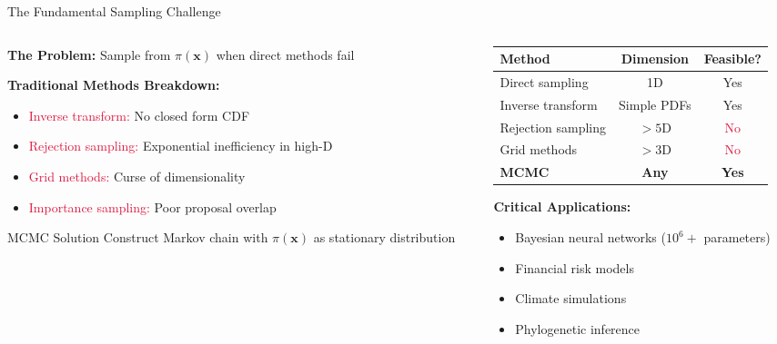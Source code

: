 \documentclass[aspectratio=169,11pt]{beamer}
\newcommand{\bx}{\mathbf{x}}
\begin{document}
\begin{frame}{The Fundamental Sampling Challenge}
\begin{columns}
\begin{column}{0.5\textwidth}
\textbf{The Problem:} Sample from $\pi(\bx)$ when direct methods fail

\vspace{0.3cm}
\textbf{Traditional Methods Breakdown:}
\begin{itemize}
\item \textcolor{crimson}{Inverse transform:} No closed form CDF
\item \textcolor{crimson}{Rejection sampling:} Exponential inefficiency in high-D
\item \textcolor{crimson}{Grid methods:} Curse of dimensionality
\item \textcolor{crimson}{Importance sampling:} Poor proposal overlap
\end{itemize}

\vspace{0.3cm}
\begin{block}{MCMC Solution}
Construct Markov chain with $\pi(\bx)$ as stationary distribution
\end{block}
\end{column}
\begin{column}{0.5\textwidth}
\begin{table}
\centering
\small
\begin{tabular}{lcc}
\toprule
\textbf{Method} & \textbf{Dimension} & \textbf{Feasible?} \\
\midrule
Direct sampling & 1D & \textcolor{forest}{Yes} \\
Inverse transform & Simple PDFs & \textcolor{forest}{Yes} \\
Rejection sampling & $>5$D & \textcolor{crimson}{No} \\
Grid methods & $>3$D & \textcolor{crimson}{No} \\
\textbf{MCMC} & \textbf{Any} & \textcolor{forest}{\textbf{Yes}} \\
\bottomrule
\end{tabular}
\end{table}

\vspace{0.3cm}
\textbf{Critical Applications:}
\begin{itemize}
\item Bayesian neural networks ($10^6+$ parameters)
\item Financial risk models
\item Climate simulations
\item Phylogenetic inference
\end{itemize}
\end{column}
\end{columns}
\end{frame}
\end{document}
